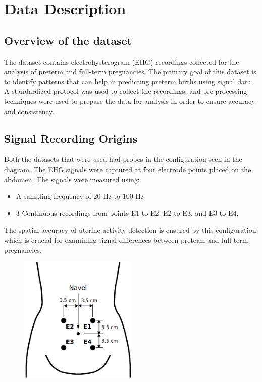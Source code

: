\documentclass[conference]{IEEEtran}
\begin{document}
\section{Data Description}
\subsection{Overview of the dataset}
The dataset contains electrohysterogram (EHG) recordings collected for the analysis of preterm and full-term pregnancies. The primary goal of this dataset is to identify patterns that can help in predicting preterm births using signal data. A standardized protocol was used to collect the recordings, and pre-processing techniques were used to prepare the data for analysis in order to ensure accuracy and consistency.

\subsection{Signal Recording Origins}
Both the datasets that were used had probes in the configuration seen in the diagram. The EHG signals were captured at four electrode points placed on the abdomen. The signals were measured using:
\begin{itemize}
	\item A sampling frequency of 20 Hz to 100 Hz
	\item 3 Continuous recordings from points E1 to E2, E2 to E3, and E3 to E4.
\end{itemize}
The spatial accuracy of uterine activity detection is ensured by this configuration, which is crucial for examining signal differences between preterm and full-term pregnancies.

\begin{figure}[h]
	\includegraphics[width=0.5\textwidth]{images/sensor_placement.png}
\end{figure}
\end{document}
